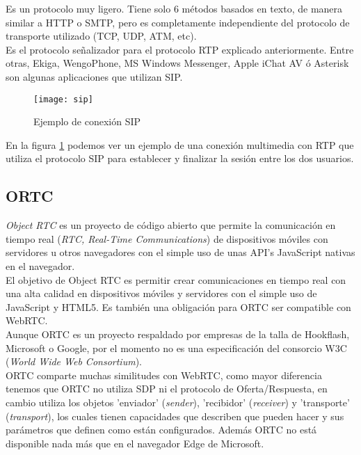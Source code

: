 Es un protocolo muy ligero. Tiene solo 6 métodos basados en texto, de manera similar a HTTP o SMTP, pero es completamente independiente del protocolo de transporte utilizado (TCP, UDP, ATM, etc). \\

Es el protocolo señalizador para el protocolo RTP explicado anteriormente. Entre otras, Ekiga, WengoPhone, MS Windows Messenger, Apple iChat AV ó Asterisk son algunas aplicaciones que utilizan SIP.\\


\begin{figure}[htb]
\centering
\texttt{[image: sip]}
\caption{Ejemplo de conexión SIP}
\label{fig:sip}
\end{figure}

En la figura \ref{fig:sip} podemos ver un ejemplo de una conexión multimedia con RTP que utiliza el protocolo SIP para establecer y finalizar la sesión entre los dos usuarios.\\

\subsection{ORTC}

\emph{Object RTC} es un proyecto de código abierto que permite la comunicación en tiempo real (\emph{RTC, Real-Time Communications}) de dispositivos móviles con servidores u otros navegadores con el simple uso de unas API's JavaScript nativas en el navegador.\\ 

El objetivo de Object RTC es permitir crear comunicaciones en tiempo real con una alta calidad en dispositivos móviles y servidores con el simple uso de JavaScript y HTML5. Es también una obligación para ORTC ser compatible con WebRTC.\\

Aunque ORTC es un proyecto respaldado por empresas de la talla de Hookflash, Microsoft o Google, por el momento no es una especificación del consorcio W3C (\emph{World Wide Web Consortium}).\\

ORTC comparte muchas similitudes con WebRTC, como mayor diferencia tenemos que ORTC no utiliza SDP ni el protocolo de Oferta/Respuesta, en cambio utiliza los objetos 'enviador' (\emph{sender}), 'recibidor' (\emph{receiver}) y 'transporte' (\emph{transport}), los cuales tienen capacidades que describen que pueden hacer y sus parámetros que definen como están configurados. Además ORTC no está disponible nada más que en el navegador Edge de Microsoft.\\

